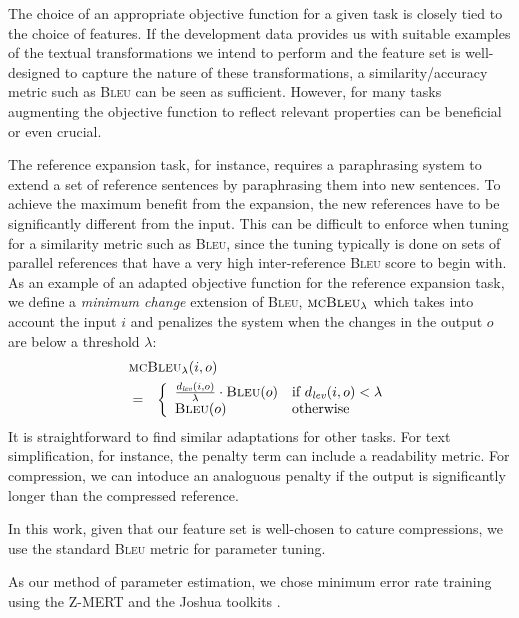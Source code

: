 \documentclass[11pt]{article}
\begin{document}
The choice of an appropriate objective function for a given task is
closely tied to the choice of features. If the development data
provides us with suitable examples of the textual transformations we
intend to perform and the feature set is well-designed to capture the
nature of these transformations, a similarity/accuracy metric such as
\textsc{Bleu} can be seen as sufficient. However, for many tasks
augmenting the objective function to reflect relevant properties can
be beneficial or even crucial.

The reference expansion task, for instance, requires a paraphrasing
system to extend a set of reference sentences by paraphrasing them
into new sentences. To achieve the maximum benefit from the expansion,
the new references have to be significantly different from the
input. This can be difficult to enforce when tuning for a similarity
metric such as \textsc{Bleu}, since the tuning typically is done on
sets of parallel references that have a very high inter-reference
\textsc{Bleu} score to begin with. As an example of an adapted
objective function for the reference expansion task, we define a
\emph{minimum change} extension of \textsc{Bleu},
$\textsc{mcBleu}_\lambda$ which takes into account the input $i$ and
penalizes the system when the changes in the output $o$ are below a
threshold $\lambda$:
\begin{eqnarray}
  \lefteqn{ \textsc{mcBleu}_\lambda(i, o) } \nonumber\\
  &=& \left\{ \begin{array}{ll}
      \frac{d_{\mathit{lev}}(i, o)}{\lambda} \cdot \textsc{Bleu}(o) & \textrm{if
        $d_{\mathit{lev}}(i, o) <\lambda$} \nonumber \\ 
      \textsc{Bleu}(o) & \textrm{otherwise}
\end{array} \right.
\end{eqnarray} 
It is straightforward to find similar adaptations for other tasks. For
text simplification, for instance, the penalty term can include a
readability metric. For compression, we can intoduce an analoguous
penalty if the output is significantly longer than the compressed
reference.

In this work, given that our feature set is well-chosen to cature
compressions, we use the standard \textsc{Bleu} metric for parameter
tuning.

As our method of parameter estimation, we chose minimum error rate
training \cite{Och2003c} using the Z-MERT and the Joshua toolkits
\cite{Zaidan2009,Joshua-WMT}.
\end{document}
